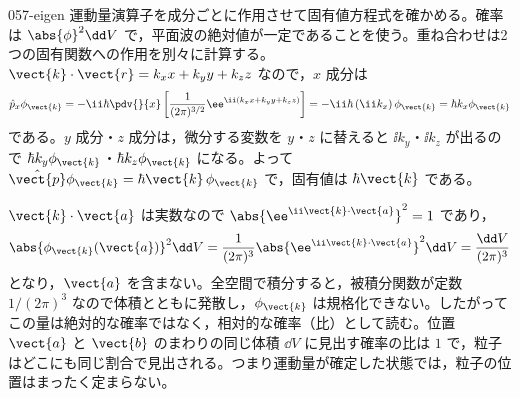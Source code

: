 \documentclass[uplatex,dvipdfmx,a4paper,11pt]{jsarticle}
\begin{document}
\kaitouhen
{}
\begin{kaisetsu}{057-eigen}
\houshin 運動量演算子を成分ごとに作用させて固有値方程式を確かめる。確率は $\abs{\phi}^{2}\dd V$ で，平面波の絶対値が一定であることを使う。重ね合わせは2つの固有関数への作用を別々に計算する。
\keisan {} $\vect{k}\cdot\vect{r}=k_{x}x+k_{y}y+k_{z}z$ なので，$x$ 成分は
\[ \hat{p}_{x}\phi_{\vect{k}}=-\ii\hbar\pdv{}{x}\left[\frac{1}{(2\pi)^{3/2}}\ee^{\ii(k_{x}x+k_{y}y+k_{z}z)}\right]=-\ii\hbar\,(\ii k_{x})\,\phi_{\vect{k}}=\hbar k_{x}\phi_{\vect{k}} \]
である。$y$ 成分・$z$ 成分は，微分する変数を $y$・$z$ に替えると $\ii k_{y}$・$\ii k_{z}$ が出るので $\hbar k_{y}\phi_{\vect{k}}$・$\hbar k_{z}\phi_{\vect{k}}$ になる。よって $\hat{\vect{p}}\phi_{\vect{k}}=\hbar\vect{k}\,\phi_{\vect{k}}$ で，固有値は $\hbar\vect{k}$ である。

 $\vect{k}\cdot\vect{a}$ は実数なので $\abs{\ee^{\ii\vect{k}\cdot\vect{a}}}^{2}=1$ であり，
\[ \abs{\phi_{\vect{k}}(\vect{a})}^{2}\dd V=\frac{1}{(2\pi)^{3}}\abs{\ee^{\ii\vect{k}\cdot\vect{a}}}^{2}\dd V=\frac{\dd V}{(2\pi)^{3}} \]
となり，$\vect{a}$ を含まない。全空間で積分すると，被積分関数が定数 $1/(2\pi)^{3}$ なので体積とともに発散し，$\phi_{\vect{k}}$ は規格化できない。したがってこの量は絶対的な確率ではなく，相対的な確率（比）として読む。位置 $\vect{a}$ と $\vect{b}$ のまわりの同じ体積 $\dd V$ に見出す確率の比は $1$ で，粒子はどこにも同じ割合で見出される。つまり運動量が確定した状態では，粒子の位置はまったく定まらない。


\end{kaisetsu}
\end{document}
